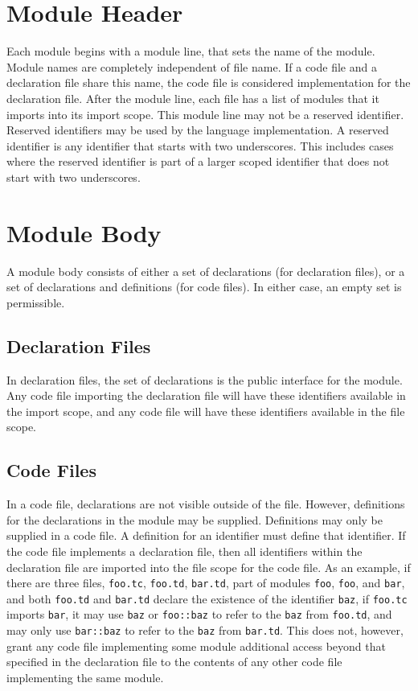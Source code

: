 \documentclass[letterpaper,12pt]{book}
\begin{document}
\section{Module Header}

Each module begins with a module line, that sets the name of the module. Module names are completely independent of file name. If a code file and a declaration file share this name, the code file is considered implementation for the declaration file. After the module line, each file has a list of modules that it imports into its import scope. This module line may not be a reserved identifier. Reserved identifiers may be used by the language implementation. A reserved identifier is any identifier that starts with two underscores. This includes cases where the reserved identifier is part of a larger scoped identifier that does not start with two underscores.

\section{Module Body}

A module body consists of either a set of declarations (for declaration files), or a set of declarations and definitions (for code files). In either case, an empty set is permissible.

\subsection{Declaration Files}

In declaration files, the set of declarations is the public interface for the module. Any code file importing the declaration file will have these identifiers available in the import scope, and any code file will have these identifiers available in the file scope.

\subsection{Code Files}

In a code file, declarations are not visible outside of the file. However, definitions for the declarations in the module may be supplied. Definitions may only be supplied in a code file. A definition for an identifier must define that identifier. If the code file implements a declaration file, then all identifiers within the declaration file are imported into the file scope for the code file. As an example, if there are three files, \texttt{foo.tc}, \texttt{foo.td}, \texttt{bar.td}, part of modules \texttt{foo}, \texttt{foo}, and \texttt{bar}, and both \texttt{foo.td} and \texttt{bar.td} declare the existence of the identifier \texttt{baz}, if \texttt{foo.tc} imports \texttt{bar}, it may use \texttt{baz} or \texttt{foo::baz} to refer to the \texttt{baz} from \texttt{foo.td}, and may only use \texttt{bar::baz} to refer to the \texttt{baz} from \texttt{bar.td}. This does not, however, grant any code file implementing some module additional access beyond that specified in the declaration file to the contents of any other code file implementing the same module.
\end{document}
